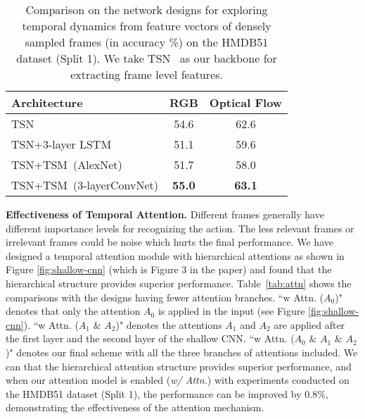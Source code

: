 \documentclass[english, 10pt, twocolumn, twoside]{IEEEtran}
\begin{document}
\begin{table}[t]
 \caption{Comparison on the network designs for exploring temporal dynamics from feature vectors of densely sampled frames (in accuracy \%) on the HMDB51 dataset (Split 1). We take TSN~\cite{wang2016temporal} as our backbone for extracting frame level features.}
 \fontsize{9pt}{10pt}\selectfont\centering
 \label{tab:vscnn}
 \begin{center}
   \begin{tabular}{|l|c|c|}
     \hline
     Architecture & RGB & Optical Flow \\
     \hline\hline
     TSN \cite{wang2016temporal} & 54.6 & 62.6 \\
TSN+3-layer LSTM & 51.1 & 59.6 \\
TSN+TSM~(AlexNet) & 51.7 & 58.0 \\
TSN+TSM~(3-layerConvNet) & \textbf{55.0} & \textbf{63.1} \\
\hline
   \end{tabular}
 \end{center}
\vspace{-2mm}
\end{table}


\noindent\textbf{Effectiveness of Temporal Attention.} Different frames generally have different importance levels for recognizing the action. The less relevant frames or irrelevant frames could be noise which hurts the final performance. We have designed a temporal attention module with hierarchical attentions as shown in Figure \ref{fig:shallow-cnn} (which is Figure 3 in the paper) and found that the hierarchical structure provides superior performance. Table~\ref{tab:attn} shows the comparisons with the designs having fewer attention branches. ``w Attn. ($A_0$)" denotes that only the attention $A_0$ is applied in the input (see Figure \ref{fig:shallow-cnn}).  ``w Attn. ($A_1$ \& $A_2$)" denotes the attentions $A_1$ and $A_2$ are applied after the first layer and the second layer of the shallow CNN. ``w Attn. ($A_0$ \& $A_1$ \& $A_2$)" denotes our final scheme with all the three branches of attentions included. We can that the hierarchical attention structure provides superior performance, and when our attention model is enabled (\emph{w/ Attn.}) with experiments conducted on the HMDB51 dataset (Split 1), the performance can be improved by 0.8\%, demonstrating the effectiveness of the attention mechanism. 
\end{document}
